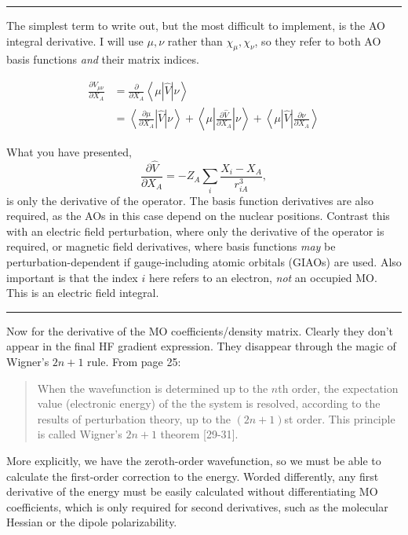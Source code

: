 \documentclass[%
class = book,%
crop = false,%
float = true,%
multi = true,%
preview = false,%
]{standalone}
\begin{document}
\begin{center}\rule{0.5\linewidth}{\linethickness}\end{center}

The simplest term to write out, but the most difficult to implement, is the AO integral derivative. I will use \(\mu,\nu\) rather than \(\chi_{\mu},\chi_{\nu}\), so they refer to both AO basis functions \emph{and} their matrix indices.

\begin{align*}
  \frac{\partial V_{\mu\nu}}{\partial X_{A}} &= \frac{\partial}{\partial X_{A}} \left< \mu | \hat{V} | \nu \right> \tag{Yamaguchi eq. 3.24} \\
                                             &= \left< \frac{\partial \mu}{\partial X_{A}} | \hat{V} | \nu \right> + \left< \mu | \frac{\partial \hat{V}}{\partial X_{A}} | \nu \right> + \left< \mu | \hat{V} | \frac{\partial \nu}{\partial X_{A}} \right> \label{3.25}\tag{Yamaguchi eq. 3.25}
\end{align*}

What you have presented, %
\begin{equation}
  \frac{\partial \hat{V}}{\partial X_{A}} = -Z_{A} \sum_{i} \frac{X_{i} - X_{A}}{r_{iA}^{3}},
\end{equation}
is only the derivative of the operator. The basis function derivatives are also required, as the AOs in this case depend on the nuclear positions. Contrast this with an electric field perturbation, where only the derivative of the operator is required, or magnetic field derivatives, where basis functions \emph{may} be perturbation-dependent if gauge-including atomic orbitals (GIAOs) are used. Also important is that the index \(i\) here refers to an electron, \emph{not} an occupied MO. This is an electric field integral.

\begin{center}\rule{0.5\linewidth}{\linethickness}\end{center}

Now for the derivative of the MO coefficients/density matrix. Clearly they don't appear in the final HF gradient expression. They disappear through the magic of Wigner's \(2n + 1\) rule. From page 25:
\begin{quote}
When the wavefunction is determined up to the \(n\)th order, the expectation value (electronic energy) of the the system is resolved, according to the results of perturbation theory, up to the \((2n+1)\)st order. This principle is called Wigner's \(2n+1\) theorem {[}29-31{]}.
\end{quote}
More explicitly, we have the zeroth-order wavefunction, so we must be able to calculate the first-order correction to the energy. Worded differently, any first derivative of the energy must be easily calculated without differentiating MO coefficients, which is only required for second derivatives, such as the molecular Hessian or the dipole polarizability.
\end{document}
